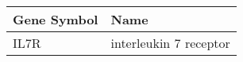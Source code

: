 \begin{tabular}{ll}
\toprule
Gene Symbol &                   Name \\
\midrule
       IL7R & interleukin 7 receptor \\
\bottomrule
\end{tabular}
